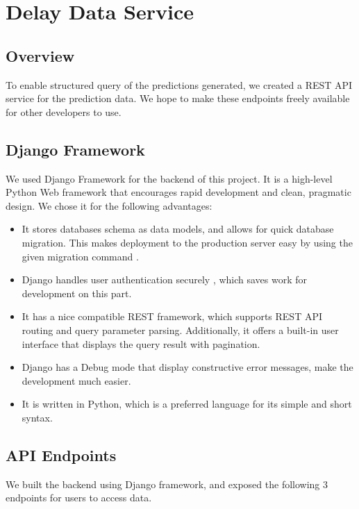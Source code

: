 \chapter{Delay Data Service}
\label{ch:data_service}
\section{Overview}
\par To enable structured query of the predictions generated, we created a REST API service for the prediction data. We hope to make these endpoints freely available for other developers to use.

\section{Django Framework}
\par We used Django Framework\cite{django_framework} for the backend of this project. It is a high-level Python Web framework that encourages rapid development and clean, pragmatic design. We chose it for the following advantages:

\begin{itemize}
  \item It stores databases schema as data models\cite{django_model}, and allows for quick database migration. This makes deployment to the production server easy by using the given migration command \cite{django_migrations}.
  \item Django handles user authentication securely \cite{django_user_auth}, which saves work for development on this part.
  \item It has a nice compatible REST framework\cite{django_rest}, which supports REST API routing\cite{django_rest_routing} and query parameter parsing. Additionally, it offers a built-in user interface that displays the query result with pagination\cite{django_rest_pagination}.
  \item Django has a Debug mode that display constructive error messages, make the development much easier.
  \item It is written in Python, which is a preferred language for its simple and short syntax.
\end{itemize}

\section{API Endpoints}
\par We built the backend using Django framework, and exposed the following 3 endpoints for users to access data.

